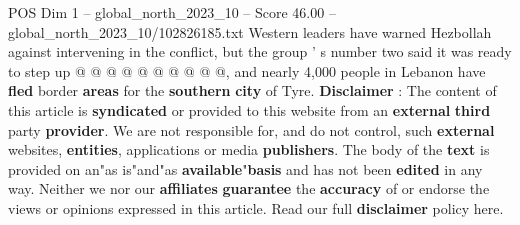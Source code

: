 \begin{textsample}{POS Dim 1 – global\_north\_2023\_10 – Score 46.00 – global\_north\_2023\_10/102826185.txt}
Western leaders have warned Hezbollah against intervening in the conflict, but the group ' s number two said it was ready to step up @ @ @ @ @ @ @ @ @ @, and nearly 4,000 people in Lebanon have \textbf{fled} border \textbf{areas} for the \textbf{southern} \textbf{city} of Tyre. \textbf{Disclaimer} : The content of this article is \textbf{syndicated} or provided to this website from an \textbf{external} \textbf{third} party \textbf{provider}.
We are not responsible for, and do not control, such \textbf{external} websites, \textbf{entities}, applications or media \textbf{publishers}.
The body of the \textbf{text} is provided on an"as is"and"as \textbf{available}"\textbf{basis} and has not been \textbf{edited} in any way.
Neither we nor our \textbf{affiliates} \textbf{guarantee} the \textbf{accuracy} of or endorse the views or opinions expressed in this article.
Read our full \textbf{disclaimer} policy here.

\end{textsample}
